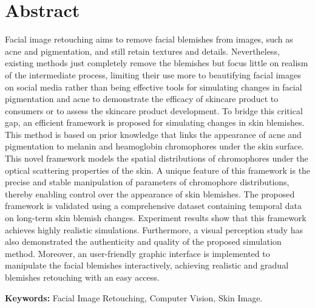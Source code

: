 \newpage

\chapter*{\centering Abstract}

\begin{spacing}{1.5}
\setlength{\parskip}{0.3in}


Facial image retouching aims to remove facial blemishes from images, such as acne and pigmentation, and still retain textures and details. Nevertheless, existing methods just completely remove the blemishes but focus little on realism of the intermediate process, limiting their use more to beautifying facial images on social media rather than being effective tools for simulating changes in facial pigmentation and acne to demonstrate the efficacy of skincare product to consumers or to assess the skincare product development. To bridge this critical gap, an efficient framework is proposed for simulating changes in skin blemishes. This method is based on prior knowledge that links the appearance of acne and pigmentation to melanin and heamoglobin chromophores under the skin surface. This novel framework models the spatial distributions of chromophores under the optical scattering properties of the skin. A unique feature of this framework is the precise and stable manipulation of parameters of chromophore distributions, thereby enabling control over the appearance of skin blemishes. The proposed framework is validated using a comprehensive dataset containing temporal data on long-term skin blemish changes. Experiment results show that this framework achieves highly realistic simulations. Furthermore, a visual perception study has also demonstrated the authenticity and quality of the proposed simulation method. Moreover, an user-friendly graphic interface is implemented to manipulate the facial blemishes interactively, achieving realistic and gradual blemishes retouching with an easy access.

\par
\textbf{Keywords:} Facial Image Retouching, Computer Vision, Skin Image.
\end{spacing}
\newpage
